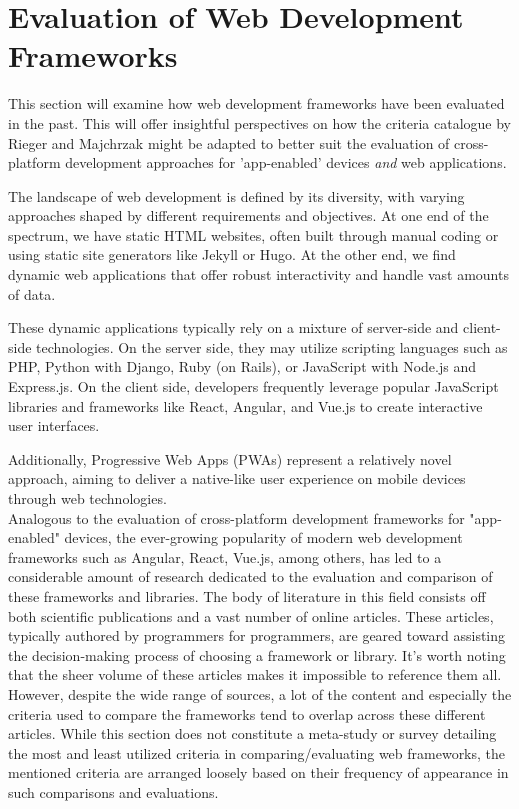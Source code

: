 \section{Evaluation of Web Development Frameworks}
This section will examine how web development frameworks have been evaluated in the past. This will offer insightful perspectives on how the criteria catalogue by Rieger and Majchrzak might be adapted to better suit the evaluation of cross-platform development approaches for 'app-enabled' devices \emph{and} web applications.

The landscape of web development is defined by its diversity, with varying approaches shaped by different requirements and objectives. At one end of the spectrum, we have static HTML websites, often built through manual coding or using static site generators like Jekyll or Hugo. At the other end, we find dynamic web applications that offer robust interactivity and handle vast amounts of data.

These dynamic applications typically rely on a mixture of server-side and client-side technologies. On the server side, they may utilize scripting languages such as PHP, Python with Django, Ruby (on Rails), or JavaScript with Node.js and Express.js. On the client side, developers frequently leverage popular JavaScript libraries and frameworks like React, Angular, and Vue.js to create interactive user interfaces.

Additionally, Progressive Web Apps (PWAs) represent a relatively novel approach, aiming to deliver a native-like user experience on mobile devices through web technologies.
\\



Analogous to the evaluation of cross-platform development frameworks for "app-enabled" devices, the ever-growing popularity of modern web development frameworks such as Angular, React, Vue.js, among others, has led to a considerable amount of research dedicated to the evaluation and comparison of these frameworks and libraries.
The body of literature in this field consists off both scientific publications and a vast number of online articles. These articles, typically authored by programmers for programmers, are geared toward assisting the decision-making process of choosing a framework or library. It's worth noting that the sheer volume of these articles makes it impossible to reference them all. However, despite the wide range of sources, a lot of the content and especially the criteria used to compare the frameworks tend to overlap across these different articles.
While this section does not constitute a meta-study or survey detailing the most and least utilized criteria in comparing/evaluating web frameworks, the mentioned criteria are arranged loosely based on their frequency of appearance in such comparisons and evaluations.

